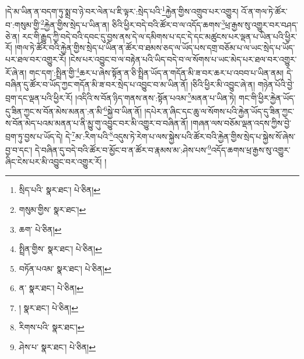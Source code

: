 །དེ་མ་ཡིན་ན་བདག་ཏུ་སྨྲ་བ་ཉེ་བར་ལེན་པ་ཇི་ལྟར་:སྲེད་པའི་\footnote{སྲིད་པའི་  སྣར་ཐང་།  པེ་ཅིན། }རྐྱེན་གྱིས་འགྲུབ་པར་འགྱུར། འོ་ན་གལ་ཏེ་ཚོར་བ་:གསུམ་གྱི་\footnote{གསུམ་གྱིས་  སྣར་ཐང་། }རྐྱེན་གྱིས་སྲེད་པ་ཡིན་ན། ཅིའི་ཕྱིར་བདེ་བའི་ཚོར་བ་ལ་འདོད་ཆགས་\footnote{ཆག་  པེ་ཅིན། }ཕྲ་རྒྱས་སུ་འགྱུར་བར་བཤད་ཅེ་ན། རང་གི་རྒྱུད་ཀྱི་བདེ་བའི་དབང་དུ་བྱས་ནས་དེ་ལ་དམིགས་པ་དང་དེ་དང་མཚུངས་པར་ལྡན་པ་ཡིན་པའི་ཕྱིར་རོ། །གལ་ཏེ་ཚོར་བའི་རྐྱེན་གྱིས་སྲེད་པ་ཡིན་ན་ཚོར་བ་ཐམས་ཅད་ལ་ཡོད་པས་དགྲ་བཅོམ་པ་ལ་ཡང་སྲེད་པ་ཡོད་པར་ཐལ་བར་འགྱུར་རོ། །ངེས་པར་འབྱུང་བ་ལ་བརྟེན་པའི་ཡིད་བདེ་བ་ལ་སོགས་པ་ཡང་མེད་པར་ཐལ་བར་འགྱུར་རོ་ཞེ་ན། གང་དག་:སྤྲིན་གྱི་\footnote{སྤྲིན་གྱིས་  སྣར་ཐང་།  པེ་ཅིན། }ཆར་པ་ཞེས་སྟོན་ན་ཅི་སྤྲིན་ཡོད་ན་གདོན་མི་ཟ་བར་ཆར་པ་འབབ་པ་ཡིན་ནམ། དེ་བཞིན་དུ་ཚོར་བ་ཡོད་ཀྱང་གདོན་མི་ཟ་བར་སྲེད་པ་འབྱུང་བ་མ་ཡིན་ནོ། །ཅིའི་ཕྱིར་མི་འབྱུང་ཞེ་ན། གཉེན་པོའི་བྱེ་བྲག་དང་ལྡན་པའི་ཕྱིར་རོ། །འདིའི་ས་བོན་ཉིད་གནས་ནས་:སྟོན་པའམ་\footnote{བཏོན་པའམ་  སྣར་ཐང་།  པེ་ཅིན། }མནན་པ་ཡིན་ཏེ། གང་གི་ཕྱིར་རྐྱེན་ཡོད་དུ་ཟིན་ཀྱང་ས་བོན་མེས་མནན་:ན་མི་\footnote{ན་  སྣར་ཐང་།  པེ་ཅིན། }སྐྱེ་བ་ཡིན་ནོ། །དཔེར་ན་ཞིང་དང་ཆུ་ལ་སོགས་པའི་རྐྱེན་ཡོད་དུ་ཟིན་ཀྱང་ས་བོན་མེད་པའམ་མནན་པ་ནི་མྱུ་གུ་འབྱུང་བར་མི་འགྱུར་བ་བཞིན་ནོ། །གཞན་ལས་བཅོམ་ལྡན་འདས་ཀྱིས་བྱེ་བྲག་ཏུ་བྱས་པ་ཡོད་དེ། དེ་\footnote{།  སྣར་ཐང་།  པེ་ཅིན། }མ་:རིག་པའི་\footnote{རིགས་པའི་  སྣར་ཐང་། }འདུས་ཏེ་རེག་པ་ལས་སྐྱེས་པའི་ཚོར་བའི་རྐྱེན་གྱིས་སྲེད་པ་སྐྱེས་སོ་ཞེས་བྱ་བ་དང་། དེ་བཞིན་དུ་བདེ་བའི་ཚོར་བ་མྱོང་བ་ན་ཚོར་བ་རྣམས་མ་:ཤེས་པས་\footnote{ཤེས་པ་  སྣར་ཐང་།  པེ་ཅིན། }འདོད་ཆགས་ཕྲ་རྒྱས་སུ་འགྱུར་ཞིང་ངེས་པར་མི་འབྱུང་བར་འགྱུར་རོ། །
